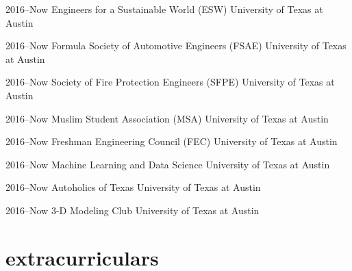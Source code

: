 \documentclass[]{friggeri-cv} %
\begin{document}
\begin{entrylist}
	\entry
	{2016--Now}
	{Engineers for a Sustainable World (ESW)}
	{University of Texas at Austin}
	{}


	\entry
	{2016--Now}
	{Formula Society of Automotive Engineers (FSAE)}
	{University of Texas at Austin}
	{}


	\entry
	{2016--Now}
	{Society of Fire Protection Engineers (SFPE)}
	{University of Texas at Austin}
	{}


	\entry
	{2016--Now}
	{Muslim Student Association (MSA)}
	{University of Texas at Austin}
	{}


	\entry
	{2016--Now}
	{Freshman Engineering Council (FEC)}
	{University of Texas at Austin}
	{}


	\entry
	{2016--Now}
	{Machine Learning and Data Science}
	{University of Texas at Austin}
	{}


	\entry
	{2016--Now}
	{Autoholics of Texas}
	{University of Texas at Austin}
	{}


	\entry
	{2016--Now}
	{3-D Modeling Club}
	{University of Texas at Austin}
	{}

\end{entrylist}

\section{extracurriculars}
\end{document}
